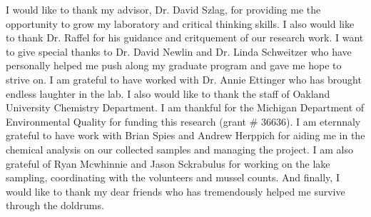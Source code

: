 I would like to thank my advisor, Dr. David Szlag, for providing me the opportunity to grow my laboratory and critical thinking skills. I also would like to thank Dr. Raffel for his guidance and critquement of our research work. I want to give special thanks to Dr. David Newlin and Dr. Linda Schweitzer who have personally helped me push along my graduate program and gave me hope to strive on. I am grateful to have worked with Dr. Annie Ettinger who has brought  endless laughter in the lab. I also would like to thank the staff of Oakland University Chemistry Department.   
I am thankful for the Michigan Department of Environmental Quality for funding this research (grant \# 36636). I am eternnaly grateful to have work with Brian Spies and Andrew Herppich for aiding me in the chemical analysis on our collected samples and managing the project. I am also grateful of Ryan Mcwhinnie and Jason Sckrabulus for working on the lake sampling, coordinating with the volunteers and mussel counts. And finally, I would like to thank my dear friends who has tremendously helped me survive through the doldrums.
